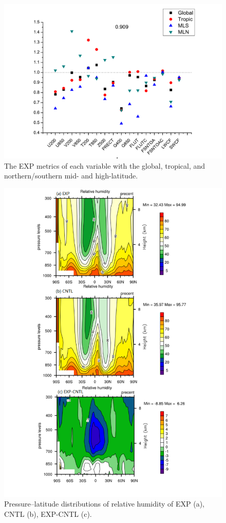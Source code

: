 \documentclass[gmd, manuscript]{copernicus}
\begin{document}
\begin{figure}[t]
\includegraphics[width=15.3cm]{reg}
\caption{The EXP metrics of each variable with the global, tropical, and northern/southern mid- and high-latitude.}
\end{figure}

\begin{figure}[t]
\includegraphics[width=15.3cm]{rh}
\caption{Pressure--latitude distributions of relative humidity of EXP (a), CNTL (b), EXP-CNTL (c).}
\end{figure}
\end{document}

